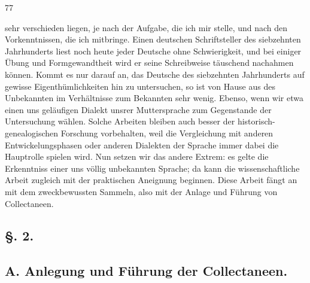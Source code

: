 {\textbar}{\textbar}77{\textbar}{\textbar}\label{sp.77}

  sehr verschieden liegen, je nach der Aufgabe, die ich mir stelle, und nach den Vorkenntnissen, die ich mitbringe. Einen deutschen Schriftsteller des siebzehnten Jahrhunderts liest noch heute jeder Deutsche ohne Schwierigkeit, und bei einiger Übung und Formgewandtheit wird er seine Schreibweise täuschend nachahmen können. Kommt es nur darauf an, das Deutsche des siebzehnten Jahrhunderts auf gewisse Eigenthümlichkeiten hin zu untersuchen, so ist von Hause aus des Unbekannten im Verhältnisse zum Bekannten sehr wenig. Ebenso, wenn wir etwa einen uns geläufigen Dialekt unsrer Muttersprache zum Gegenstande der Untersuchung wählen. Solche Arbeiten bleiben auch besser der historisch-genealogischen Forschung vorbehalten, weil die Vergleichung mit anderen Entwickelungsphasen oder anderen Dialekten der Sprache immer dabei die Hauptrolle spielen wird. Nun setzen wir das andere Extrem: es gelte die Erkenntniss einer uns völlig unbekannten Sprache; da kann die wissenschaftliche Arbeit zugleich mit der praktischen Aneignung beginnen. Diese Arbeit fängt an mit dem zweckbewussten Sammeln, also mit der Anlage und Führung von Collectaneen.

\clearpage{}
\subsection*{§. 2.}\label{II.V.2}
\subsection*{A. Anlegung und Führung der Collectaneen.}

